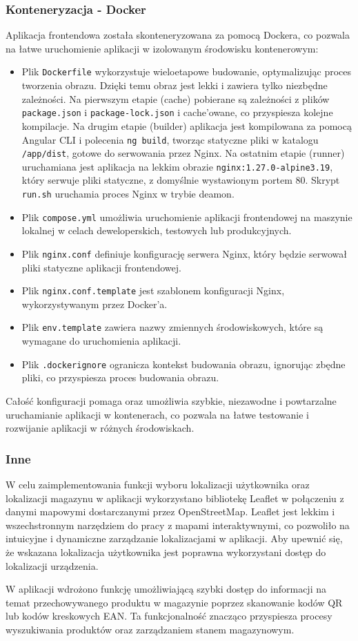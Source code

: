 \documentclass[../../main.tex]{subfiles}
\begin{document}
    \subsubsection{Konteneryzacja - Docker}
    Aplikacja frontendowa została skonteneryzowana za pomocą Dockera, co pozwala na łatwe uruchomienie aplikacji w izolowanym środowisku kontenerowym:

    \begin{itemize}
        \item Plik \texttt{Dockerfile} wykorzystuje wieloetapowe budowanie, optymalizując proces tworzenia obrazu. Dzięki temu obraz jest lekki i zawiera tylko niezbędne zależności.
        Na pierwszym etapie (cache) pobierane są zależności z plików \texttt{package.json} i \texttt{package-lock.json} i cache’owane, co przyspiesza kolejne kompilacje.
        Na drugim etapie (builder) aplikacja jest kompilowana za pomocą Angular CLI i polecenia \texttt{ng build}, tworząc statyczne pliki w katalogu \texttt{/app/dist}, gotowe do serwowania przez Nginx.
        Na ostatnim etapie (runner) uruchamiana jest aplikacja na lekkim obrazie \texttt{nginx:1.27.0-alpine3.19}, który serwuje pliki statyczne, z domyślnie wystawionym portem 80. Skrypt \texttt{run.sh} uruchamia proces Nginx w trybie deamon.
        \item Plik \texttt{compose.yml} umożliwia uruchomienie aplikacji frontendowej na maszynie lokalnej w celach deweloperskich, testowych lub produkcyjnych.
        \item Plik \texttt{nginx.conf} definiuje konfigurację serwera Nginx, który będzie serwował pliki statyczne aplikacji frontendowej.
        \item Plik \texttt{nginx.conf.template} jest szablonem konfiguracji Nginx, wykorzystywanym przez Docker'a.
        \item Plik \texttt{env.template} zawiera nazwy zmiennych środowiskowych, które są wymagane do uruchomienia aplikacji.
        \item Plik \texttt{.dockerignore} ogranicza kontekst budowania obrazu, ignorując zbędne pliki, co przyspiesza proces budowania obrazu.
    \end{itemize}
    Całość konfiguracji pomaga oraz umożliwia szybkie, niezawodne i powtarzalne uruchamianie aplikacji w kontenerach, co pozwala na łatwe testowanie i rozwijanie aplikacji w różnych środowiskach.

\subsubsection{Inne}
W celu zaimplementowania funkcji wyboru lokalizacji użytkownika oraz lokalizacji magazynu w aplikacji wykorzystano bibliotekę Leaflet\cite{leaflet} w połączeniu z danymi mapowymi dostarczanymi przez OpenStreetMap\cite{openstreetmap}. Leaflet jest lekkim i wszechstronnym narzędziem do pracy z mapami interaktywnymi, co pozwoliło na intuicyjne i dynamiczne zarządzanie lokalizacjami w aplikacji. Aby upewnić się, że wskazana lokalizacja użytkownika jest poprawna wykorzystani dostęp do lokalizacji urządzenia. 

W aplikacji wdrożono funkcję umożliwiającą szybki dostęp do informacji na temat przechowywanego produktu w magazynie poprzez skanowanie kodów QR lub kodów kreskowych EAN. Ta funkcjonalność znacząco przyspiesza procesy wyszukiwania produktów oraz zarządzaniem stanem magazynowym.
\end{document}
